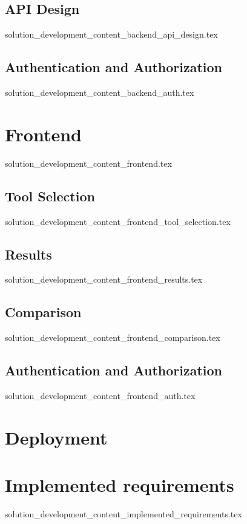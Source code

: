 \subsection{API Design}
  {solution_development_content_backend_api_design.tex}
\subsection{Authentication and Authorization}\label{sub:backend_auth}
  {solution_development_content_backend_auth.tex}

\section{Frontend}\label{sub:frontend}
  {solution_development_content_frontend.tex}
\subsection{Tool Selection}
  {solution_development_content_frontend_tool_selection.tex}
\subsection{Results}
  {solution_development_content_frontend_results.tex}
\subsection{Comparison}
  {solution_development_content_frontend_comparison.tex}
\subsection{Authentication and Authorization}\label{sub:frontend_auth}
  {solution_development_content_frontend_auth.tex}

\section{Deployment}

\section{Implemented requirements}
  {solution_development_content_implemented_requirements.tex}
